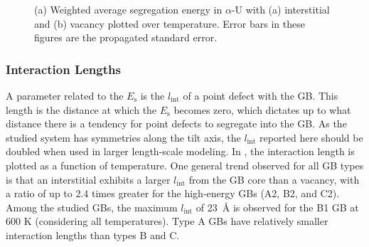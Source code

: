 \documentclass[review]{elsarticle}
\begin{document}
\begin{figure}[h!]
\centering
{} 
\caption{(a) Weighted average segregation energy in $\alpha$-U with (a) interstitial and (b) vacancy plotted over temperature. Error bars in these figures are the propagated standard error. }
\label{fig:SE}
\end{figure}


\FloatBarrier

\subsubsection{Interaction Lengths}
\par A parameter related to the $E_{\mathrm{s}}$ is the  $l_{\mathrm{int}}$ of a point defect with the GB. This length is the distance at which the $E_{\mathrm{s}}$ becomes zero, which dictates up to what distance there is a tendency for point defects to segregate into the GB. As the studied system has symmetries along the tilt axis, the $l_{\mathrm{int}}$ reported here should be doubled when used in larger length-scale modeling. In , the interaction length is plotted as a function of temperature. One general trend observed for all GB types is that an interstitial exhibits a larger  $l_{\mathrm{int}}$ from the GB core than a vacancy, with a ratio of up to 2.4 times greater for the high-energy GBs (A2, B2, and C2). Among the studied GBs, the maximum  $l_{\mathrm{int}}$ of 23~{\AA} is observed for the B1 GB at 600 K (considering all temperatures). Type A GBs have relatively smaller interaction lengths than types B and C. 
\end{document}
